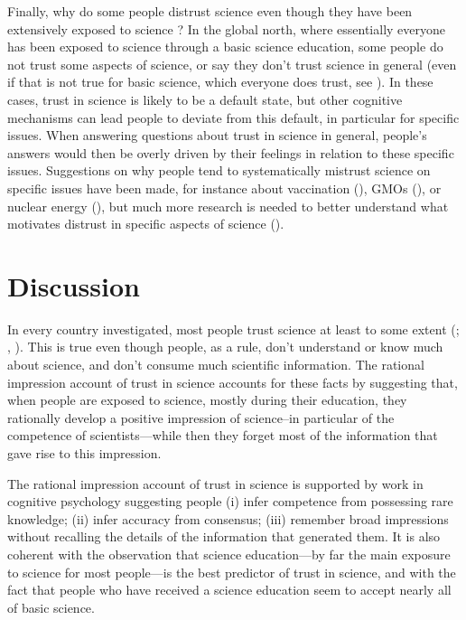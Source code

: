 \documentclass[
  jou,
  floatsintext,
  longtable,
  nolmodern,
  notxfonts,
  notimes,
  colorlinks=true,linkcolor=blue,citecolor=blue,urlcolor=blue]{apa7}
\begin{document}
Finally, why do some people distrust science even though they have been
extensively exposed to science ? In the global north, where essentially
everyone has been exposed to science through a basic science education,
some people do not trust some aspects of science, or say they don't
trust science in general (even if that is not true for basic science,
which everyone does trust, see
). In these cases, trust in science is likely to
be a default state, but other cognitive mechanisms can lead people to
deviate from this default, in particular for specific issues. When
answering questions about trust in science in general, people's answers
would then be overly driven by their feelings in relation to these
specific issues. Suggestions on why people tend to systematically
mistrust science on specific issues have been made, for instance about
vaccination
(), GMOs
(), or nuclear energy
(), but much more research is needed to better understand what
motivates distrust in specific aspects of science
().

\section{Discussion}\label{discussion}

In every country investigated, most people trust science at least to
some extent (;
,
).
This is true even though people, as a rule, don't understand or know
much about science, and don't consume much scientific information. The
rational impression account of trust in science accounts for these facts
by suggesting that, when people are exposed to science, mostly during
their education, they rationally develop a positive impression of
science--in particular of the competence of scientists---while then they
forget most of the information that gave rise to this impression.

The rational impression account of trust in science is supported by work
in cognitive psychology suggesting people (i) infer competence from
possessing rare knowledge; (ii) infer accuracy from consensus; (iii)
remember broad impressions without recalling the details of the
information that generated them. It is also coherent with the
observation that science education---by far the main exposure to science
for most people---is the best predictor of trust in science, and with
the fact that people who have received a science education seem to
accept nearly all of basic science.
\end{document}
